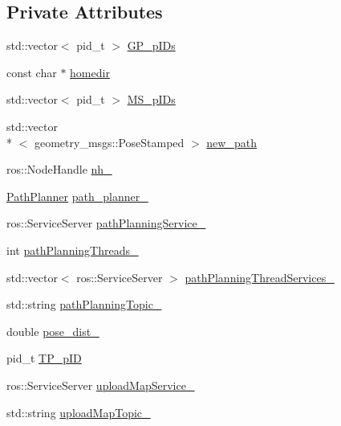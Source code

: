 \subsection*{Private Attributes}
\begin{DoxyCompactItemize}
\item 
std\-::vector$<$ pid\-\_\-t $>$ \hyperlink{classPathPlanning_abddfa7cdfc6256b97d42ab69a486f4c0}{G\-P\-\_\-p\-I\-Ds}
\item 
const char $\ast$ \hyperlink{classPathPlanning_a9ed58fad470b9b836cfa353805292362}{homedir}
\item 
std\-::vector$<$ pid\-\_\-t $>$ \hyperlink{classPathPlanning_a8aed5a7bee30a377a8d6cb24032bd861}{M\-S\-\_\-p\-I\-Ds}
\item 
std\-::vector\\*
$<$ geometry\-\_\-msgs\-::\-Pose\-Stamped $>$ \hyperlink{classPathPlanning_a7967da99fc8e0c96d987528c96312187}{new\-\_\-path}
\item 
ros\-::\-Node\-Handle \hyperlink{classPathPlanning_a0d693961ace8af4460a0d26f4404757d}{nh\-\_\-}
\item 
\hyperlink{classPathPlanner}{Path\-Planner} \hyperlink{classPathPlanning_a9baf3995e48bfcb73b15db9c9b0ee0f3}{path\-\_\-planner\-\_\-}
\item 
ros\-::\-Service\-Server \hyperlink{classPathPlanning_a7508db0be8dbd74709c582a0e3a2af60}{path\-Planning\-Service\-\_\-}
\item 
int \hyperlink{classPathPlanning_a5efb84ce4c2a62274b4d86bbe36da4e5}{path\-Planning\-Threads\-\_\-}
\item 
std\-::vector$<$ ros\-::\-Service\-Server $>$ \hyperlink{classPathPlanning_af4843567f14bcf61b51a40adf3a26842}{path\-Planning\-Thread\-Services\-\_\-}
\item 
std\-::string \hyperlink{classPathPlanning_a75832e9bcc3b6feb3ce17e9ea3f0b208}{path\-Planning\-Topic\-\_\-}
\item 
double \hyperlink{classPathPlanning_ad1da5fbacd5f283a5b778bf4c1a29d0a}{pose\-\_\-dist\-\_\-}
\item 
pid\-\_\-t \hyperlink{classPathPlanning_a27d61d0eeb2e094043c517dd7ec380f4}{T\-P\-\_\-p\-I\-D}
\item 
ros\-::\-Service\-Server \hyperlink{classPathPlanning_a0932d5ff3842ada8e5b3ba8a621df551}{upload\-Map\-Service\-\_\-}
\item 
std\-::string \hyperlink{classPathPlanning_a4a677303130f32e4f552f674b068a9b6}{upload\-Map\-Topic\-\_\-}
\end{DoxyCompactItemize}


